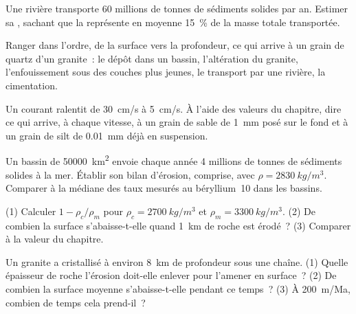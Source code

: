 \begin{exercise}[$\star$]\label{exo:g12:destruction-of-mountains:4}
Une rivière transporte 60 millions de tonnes de sédiments solides par an.
Estimer sa , sachant que la  représente en
moyenne \qty{15}{\percent} de la masse totale transportée.
\end{exercise}

\begin{exercise}[$\star$]\label{exo:g12:destruction-of-mountains:5}
Ranger dans l'ordre, de la surface vers la profondeur, ce qui arrive à un
grain de quartz d'un granite~: le dépôt dans un bassin, l'altération du
granite, l'enfouissement sous des couches plus jeunes, le transport par une
rivière, la cimentation.
\end{exercise}

\begin{exercise}[$\star\star$]\label{exo:g12:destruction-of-mountains:6}
Un courant ralentit de \qty{30}{cm/s} à \qty{5}{cm/s}. À l'aide des
valeurs du chapitre, dire ce qui arrive, à chaque vitesse, à un grain de
sable de \qty{1}{mm} posé sur le fond et à un grain de silt de
\qty{0.01}{mm} déjà en suspension.
\end{exercise}

\begin{exercise}[$\star\star$]\label{exo:g12:destruction-of-mountains:7}
Un bassin de \qty{50000}{km^2} envoie chaque année 4 millions de tonnes de
sédiments solides à la mer. Établir son bilan d'érosion, 
comprise, avec $\rho =
\qty{2830}{kg/m^3}$. Comparer à la médiane des taux mesurés au béryllium~10
dans les bassins.
\end{exercise}

\begin{exercise}[$\star\star$]\label{exo:g12:destruction-of-mountains:8}
(1) Calculer $1 - \rho_c/\rho_m$ pour $\rho_c = \qty{2700}{kg/m^3}$ et
$\rho_m = \qty{3300}{kg/m^3}$. (2) De combien la surface s'abaisse-t-elle
quand \qty{1}{km} de roche est érodé~? (3) Comparer à la valeur du
chapitre.
\end{exercise}

\begin{exercise}[$\star\star$]\label{exo:g12:destruction-of-mountains:9}
Un granite a cristallisé à environ \qty{8}{km} de profondeur sous une
chaîne. (1) Quelle épaisseur de roche l'érosion doit-elle enlever pour
l'amener en surface~? (2) De combien la surface moyenne s'abaisse-t-elle
pendant ce temps~? (3) À \qty{200}{m/Ma}, combien de temps cela prend-il~?
\end{exercise}

